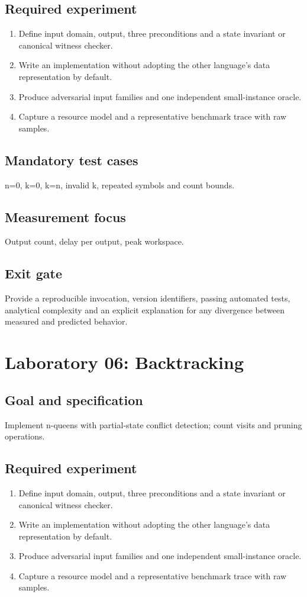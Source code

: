 \documentclass[11pt,letterpaper]{article}
\begin{document}
\subsection{Required experiment}
\begin{enumerate}
\item Define input domain, output, three preconditions and a state invariant or canonical witness checker.
\item Write an implementation without adopting the other language's data representation by default.
\item Produce adversarial input families and one independent small-instance oracle.
\item Capture a resource model and a representative benchmark trace with raw samples.
\end{enumerate}
\subsection{Mandatory test cases}
n=0, k=0, k=n, invalid k, repeated symbols and count bounds.
\subsection{Measurement focus}
Output count, delay per output, peak workspace.
\subsection{Exit gate}
Provide a reproducible invocation, version identifiers, passing automated tests, analytical complexity and an explicit explanation for any divergence between measured and predicted behavior.

\section{Laboratory 06: Backtracking}
\subsection{Goal and specification}
Implement n-queens with partial-state conflict detection; count visits and pruning operations.
\subsection{Required experiment}
\begin{enumerate}
\item Define input domain, output, three preconditions and a state invariant or canonical witness checker.
\item Write an implementation without adopting the other language's data representation by default.
\item Produce adversarial input families and one independent small-instance oracle.
\item Capture a resource model and a representative benchmark trace with raw samples.
\end{enumerate}
\end{document}
